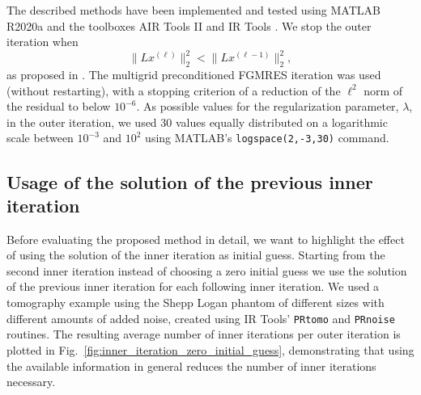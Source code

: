 The described methods have been implemented and tested using MATLAB R2020a and the toolboxes AIR Tools II \cite{art:HANS18} and IR Tools \cite{art:GAZZ19}. We stop the outer iteration when
\[
\|L x^{(\ell)}\|_2^2 < \|L x^{(\ell-1)}\|_2^2,
\]
as proposed in \cite{Gazzola_etal_2020}. The multigrid preconditioned
FGMRES iteration was used (without restarting), with a stopping criterion of a reduction of the $\ell^2$ norm of the residual to below $10^{-6}$. As possible values for the regularization parameter, $\lambda$, in the outer iteration, we used 30 values equally distributed on a logarithmic scale between $10^{-3}$ and $10^{2}$ using MATLAB's \texttt{logspace(2,-3,30)} command.

\subsection{Usage of the solution of the previous inner iteration}
Before evaluating the proposed method in detail, we want to highlight the effect of using the solution of the inner iteration as initial guess. Starting from the second inner iteration instead of choosing a zero initial guess we use the solution of the previous inner iteration for each following inner iteration. We used a tomography example using the Shepp Logan phantom of different sizes with different amounts of added noise, created using IR Tools' \cite{art:GAZZ19} \texttt{PRtomo} and \texttt{PRnoise} routines. The resulting average number of inner iterations per outer iteration is plotted in Fig.~\ref{fig:inner_iteration_zero_initial_guess}, demonstrating that using the available information in general reduces the number of inner iterations necessary.
